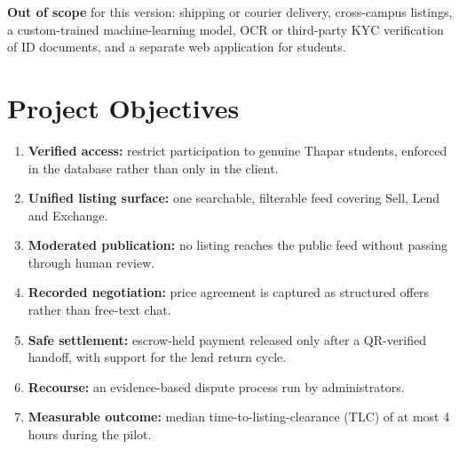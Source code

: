 \documentclass[11pt,a4paper]{scrreprt}
\begin{document}
\textbf{Out of scope} for this version: shipping or courier delivery,
cross-campus listings, a custom-trained machine-learning model, OCR or
third-party KYC verification of ID documents, and a separate web
application for students.

\section{Project Objectives}
\begin{enumerate}[label=\textbf{O\arabic*.}]
  \item \textbf{Verified access:} restrict participation to genuine Thapar
    students, enforced in the database rather than only in the client.
  \item \textbf{Unified listing surface:} one searchable, filterable feed
    covering Sell, Lend and Exchange.
  \item \textbf{Moderated publication:} no listing reaches the public feed
    without passing through human review.
  \item \textbf{Recorded negotiation:} price agreement is captured as
    structured offers rather than free-text chat.
  \item \textbf{Safe settlement:} escrow-held payment released only after a
    QR-verified handoff, with support for the lend return cycle.
  \item \textbf{Recourse:} an evidence-based dispute process run by
    administrators.
  \item \textbf{Measurable outcome:} median time-to-listing-clearance (TLC)
    of at most 4 hours during the pilot.
\end{enumerate}
\end{document}
